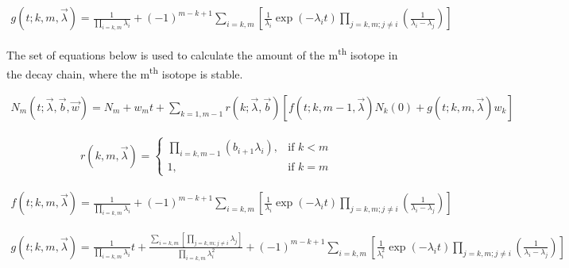\begin{equation}
\begin{split}
g(t;k,m,\vec{\lambda})
= \frac{1}{\prod_{i=k,m} \lambda_i }
+ \left( -1 \right)^{m-k+1}
\sum_{i=k,m}
\left[
\frac{1}{\lambda_i }
\exp(-\lambda_i t)
\prod_{j=k,m;j\neq i}
\left(
\frac{1}{\lambda_i - \lambda_j}
\right )
\right]
\end{split}
\end{equation}

The set of equations below is used to calculate the amount of the m\textsuperscript{th} isotope in the decay chain, where the m\textsuperscript{th} isotope is stable.

\begin{equation}
\begin{split}
N_{m}(t; \vec{\lambda}, \vec{b}, \vec{w})
= N_{m} + w_{m} t +
\sum_{k=1,m-1} r(k; \vec{\lambda}, \vec{b}) \left[ f(t; k,m-1,\vec{\lambda}) N_{k}(0) + g(t;k,m,\vec{\lambda}) w_{k} \right ]
\end{split}
\end{equation}

\begin{equation}
\begin{split}
r(k,m,\vec{\lambda}) =
\begin{cases}
\prod_{i=k,m-1} \left( b_{i+1} \lambda_{i} \right) , & \text{if } k < m\\
1, & \text{if }k = m
\end{cases}
\end{split}
\end{equation}

\begin{equation}
\begin{split}
f(t;k,m,\vec{\lambda})
= \frac{1}{\prod_{i=k,m} \lambda_i }
+ \left( -1 \right)^{m-k+1}
\sum_{i=k,m}
\left[
\frac{1}{\lambda_i }
\exp(-\lambda_i t)
\prod_{j=k,m;j\neq i}
\left(
\frac{1}{\lambda_i - \lambda_j}
\right )
\right]
\end{split}
\end{equation}

\begin{equation}
\begin{split}
g(t;k,m,\vec{\lambda})
= \frac{1}{\prod_{i=k,m} \lambda_i } t
+ \frac{\sum_{i=k,m} \left[ \prod_{j=k,m; j \neq i} \lambda_{j} \right]}
{\prod_{i=k,m} \lambda_{i}^2}
+ \left( -1 \right)^{m-k+1}
\sum_{i=k,m}
\left[
\frac{1}{\lambda_i^2}
\exp(-\lambda_i t)
\prod_{j=k,m;j\neq i}
\left(
\frac{1}{\lambda_i - \lambda_j}
\right)
\right]
\end{split}
\end{equation}


